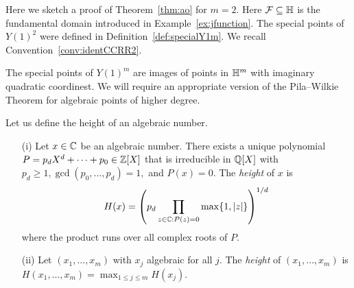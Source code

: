 Here we sketch a proof of Theorem~\ref{thm:ao} for $m=2$. Here ${\mathcal F}
\subseteq{\mathbb{H}}$ is the fundamental domain introduced in
Example~\ref{ex:jfunction}. The special points of $Y(1)^2$ were
defined in Definition~\ref{def:specialY1m}. We recall
Convention~\ref{conv:identCCRR2}. 


The special points of $Y(1)^m$ are images of points in ${\mathbb{H}}^m$ with
imaginary quadratic coordinest.
We will require an appropriate version of the Pila--Wilkie
Theorem for algebraic points of higher degree.

Let us define the height of an algebraic number.

\begin{definition}
  \label{def:height2}  
  \begin{enumerate}
  \item [(i)] Let $x\in{\mathbb{C}}$ be an algebraic number. There exists
    a unique polynomial $P=p_dX^d+\cdots+p_0\in {\mathbb{Z}}[X]$ that is
    irreducible in ${\mathbb{Q}}[X]$ with $p_d\ge
    1,
    \gcd(p_0,\ldots,p_d)=1,$ and $P(x)=0$. The \emph{height} of $x$
    is
    \begin{equation*}
      H(x) = \left(p_d \prod_{z\in {\mathbb{C}} : P(z)=0} \max\{1,|z|\}\right)^{1/d}
    \end{equation*}
    where the product runs over all complex roots of $P$.
  \item[(ii)] Let $(x_1,\ldots,x_m)$ with $x_j$
    algebraic for all $j$. The \emph{height} of
    $(x_1,\ldots,x_m)$ is
    $H(x_1,\ldots,x_m) = \max_{1\le j\le m}H(x_j)$. 
  \end{enumerate}
\end{definition}


